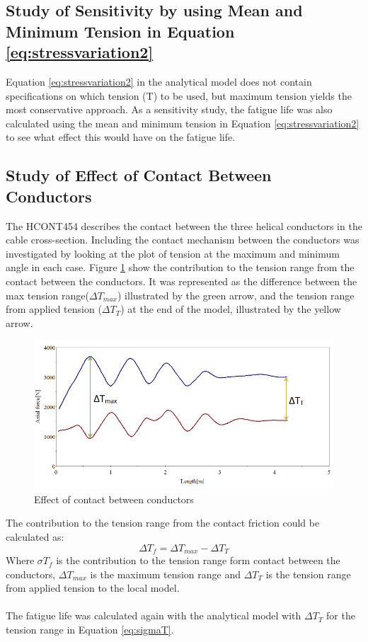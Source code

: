\subsection{Study of Sensitivity by using Mean and Minimum Tension in Equation \ref{eq:stressvariation2}}
\label{sec:min}
Equation \ref{eq:stressvariation2}  in the analytical model does not contain specifications on which tension (T) to be used, but maximum tension yields the most conservative approach.  As a sensitivity study, the fatigue life was also calculated using the mean and minimum tension in Equation \ref{eq:stressvariation2} to see what effect this would have on the fatigue life. 
\subsection{Study of Effect of Contact Between Conductors}
The HCONT454 describes the contact between the three helical conductors in the cable cross-section. Including the contact mechanism between the conductors was investigated by looking at the plot of tension at the maximum and minimum angle in each case. Figure \ref{fig:condfric} show the contribution to the tension range from the contact between the conductors. It was represented as the difference between the max tension range($\Delta T_{max}$) illustrated by the green arrow, and the tension range from applied tension ($\Delta T_T$) at the end of the model, illustrated by the yellow arrow.

\begin{figure}[H]
\centering
\includegraphics[scale=0.7]{figures/confric.PNG}
\caption[$\; \:$ Effect of contact between conductors]{Effect of contact between conductors}
 \label{fig:condfric}
\end{figure}
The contribution to the tension range from the contact friction could be calculated as:
\begin{equation}
    \Delta T_f = \Delta T_{max} - \Delta T_T
\end{equation}
Where $\sigma T_f$ is the contribution to the tension range form contact between the conductors, $\Delta T_{max}$ is the maximum tension range and $\Delta T_T$ is the tension range from applied tension to the local model. \\\\The fatigue life was calculated again with the analytical model with $\Delta T_T$ for the tension range in Equation \ref{eq:sigmaT}.

